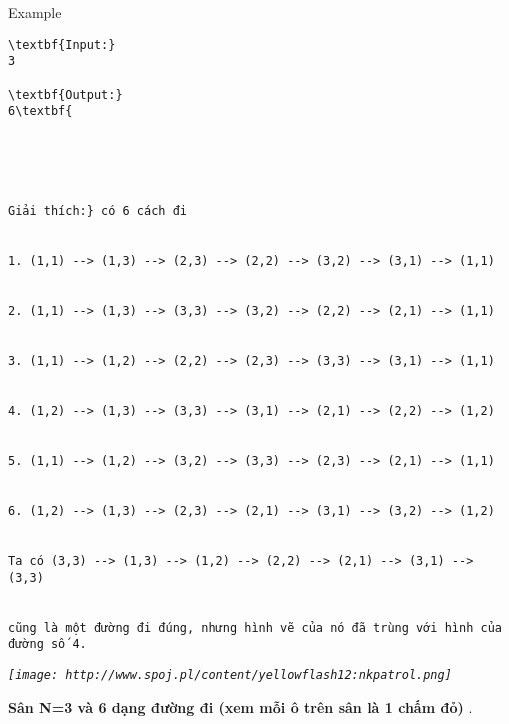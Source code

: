 Example
\begin{verbatim}
\textbf{Input:}
3

\textbf{Output:}
6\textbf{





Giải thích:} có 6 cách đi


1. (1,1) --> (1,3) --> (2,3) --> (2,2) --> (3,2) --> (3,1) --> (1,1)


2. (1,1) --> (1,3) --> (3,3) --> (3,2) --> (2,2) --> (2,1) --> (1,1)


3. (1,1) --> (1,2) --> (2,2) --> (2,3) --> (3,3) --> (3,1) --> (1,1)


4. (1,2) --> (1,3) --> (3,3) --> (3,1) --> (2,1) --> (2,2) --> (1,2)


5. (1,1) --> (1,2) --> (3,2) --> (3,3) --> (2,3) --> (2,1) --> (1,1)


6. (1,2) --> (1,3) --> (2,3) --> (2,1) --> (3,1) --> (3,2) --> (1,2)


Ta có (3,3) --> (1,3) --> (1,2) --> (2,2) --> (2,1) --> (3,1) --> (3,3) 


cũng là một đường đi đúng, nhưng hình vẽ của nó đã trùng với hình của đường số 4.\end{verbatim}

\emph{
\texttt{[image: http://www.spoj.pl/content/yellowflash12:nkpatrol.png]}}

\textbf{    Sân N=3 và 6 dạng đường đi (xem mỗi ô trên sân là 1 chấm đỏ)   }   .
